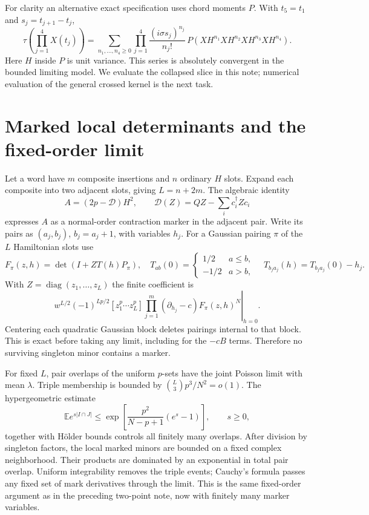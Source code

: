 \documentclass[11pt,a4paper]{article}
\newcommand{\E}{\mathbb E}
\begin{document}
For clarity an alternative exact specification uses chord moments $P$.
With $t_5=t_1$ and $s_j=t_{j+1}-t_j$,
\begin{equation}
 \tau\!\left(\prod_{j=1}^4X(t_j)\right)
 =\sum_{n_1,\ldots,n_4\ge0}
 \prod_{j=1}^4\frac{(i\sigma s_j)^{n_j}}{n_j!}\,
 P(XH^{n_1}XH^{n_2}XH^{n_3}XH^{n_4}).\label{series}
\end{equation}
Here $H$ inside $P$ is unit variance. This series is absolutely convergent
in the bounded limiting model. We evaluate the collapsed slice in this
note; numerical evaluation of the general crossed kernel is the next task.

\newpage\appendix
\section{Marked local determinants and the fixed-order limit}
Let a word have $m$ composite insertions and $n$ ordinary $H$ slots.
Expand each composite into two adjacent slots, giving $L=n+2m$.
The algebraic identity
\begin{equation}
 A=(2p-\mathcal D)H^2,\qquad
 \mathcal D(Z)=QZ-\sum_i c_i^\dagger Zc_i
\end{equation}
expresses $A$ as a normal-order contraction marker in the adjacent pair.
Write its pairs as $(a_j,b_j)$, $b_j=a_j+1$, with variables $h_j$.
For a Gaussian pairing $\pi$ of the $L$ Hamiltonian slots use
\begin{equation}
 F_\pi(z,h)=\det(I+ZT(h)P_\pi),\quad
 T_{ab}(0)=\begin{cases}1/2&a\le b,\\-1/2&a>b,\end{cases}
 \quad T_{b_j a_j}(h)=T_{b_j a_j}(0)-h_j.
\end{equation}
With $Z=\operatorname{diag}(z_1,\ldots,z_L)$ the finite coefficient is
\begin{equation}
 w^{L/2}(-1)^{Lp/2}
 [z_1^p\cdots z_L^p]\left.
 \prod_{j=1}^m(\partial_{h_j}-c)F_\pi(z,h)^N\right|_{h=0}.
\end{equation}
Centering each quadratic Gaussian block deletes pairings internal to that
block. This is exact before taking any limit, including for the
$-cB$ terms. Therefore no surviving singleton minor contains a marker.

For fixed $L$, pair overlaps of the uniform $p$-sets have the joint
Poisson limit with mean $\lambda$. Triple membership is bounded by
$\binom L3p^3/N^2=o(1)$. The hypergeometric estimate
\begin{equation}
 \E e^{s|I\cap J|}\le
 \exp\!\left[\frac{p^2}{N-p+1}(e^s-1)\right],\qquad s\ge0,
\end{equation}
together with H\"older bounds controls all finitely many overlaps.
After division by singleton factors, the local marked minors are bounded
on a fixed complex neighborhood. Their products are dominated by an
exponential in total pair overlap. Uniform integrability removes the
triple events; Cauchy's formula passes any fixed set of mark derivatives
through the limit. This is the same fixed-order argument as in the
preceding two-point note, now with finitely many marker variables.
\end{document}

